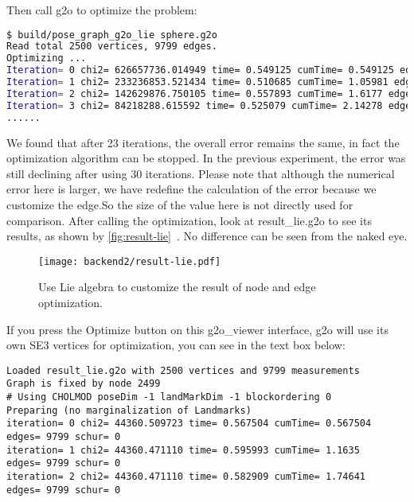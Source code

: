 Then call g2o to optimize the problem:

\begin{lstlisting}[language=sh,caption=terminal input:]
$ build/pose_graph_g2o_lie sphere.g2o
Read total 2500 vertices, 9799 edges.
Optimizing ...
Iteration= 0 chi2= 626657736.014949 time= 0.549125 cumTime= 0.549125 edges= 9799 schur= 0 lambda= 6706.585223 levenbergIter= 1
Iteration= 1 chi2= 233236853.521434 time= 0.510685 cumTime= 1.05981 edges= 9799 schur= 0 lambda= 2235.528408 levenbergIter= 1
Iteration= 2 chi2= 142629876.750105 time= 0.557893 cumTime= 1.6177 edges= 9799 schur= 0 lambda= 745.176136 levenbergIter= 1
Iteration= 3 chi2= 84218288.615592 time= 0.525079 cumTime= 2.14278 edges= 9799 schur= 0 lambda= 248.392045 levenbergIter= 1
......
\end{lstlisting}

We found that after 23 iterations, the overall error remains the same, in fact the optimization algorithm can be stopped. In the previous experiment, the error was still declining after using 30 iterations. Please note that although the numerical error here is larger, we have redefine the calculation of the error because we customize the edge.So the size of the value here is not directly used for comparison. After calling the optimization, look at result\_lie.g2o to see its results, as shown by \autoref{fig:result-lie}~. No difference can be seen from the naked eye.

\begin{figure}[!ht]
    \centering
    \texttt{[image: backend2/result-lie.pdf]}
    \caption{Use Lie algebra to customize the result of node and edge optimization. }
    \label{fig:result-lie}
\end{figure}
    
If you press the Optimize button on this g2o\_viewer interface, g2o will use its own SE3 vertices for optimization, you can see in the text box below:
    
\begin{lstlisting}
Loaded result_lie.g2o with 2500 vertices and 9799 measurements
Graph is fixed by node 2499
# Using CHOLMOD poseDim -1 landMarkDim -1 blockordering 0
Preparing (no marginalization of Landmarks)
iteration= 0 chi2= 44360.509723 time= 0.567504 cumTime= 0.567504 edges= 9799 schur= 0
iteration= 1 chi2= 44360.471110 time= 0.595993 cumTime= 1.1635   edges= 9799 schur= 0
iteration= 2 chi2= 44360.471110 time= 0.582909 cumTime= 1.74641  edges= 9799 schur= 0
\end{lstlisting}
    
